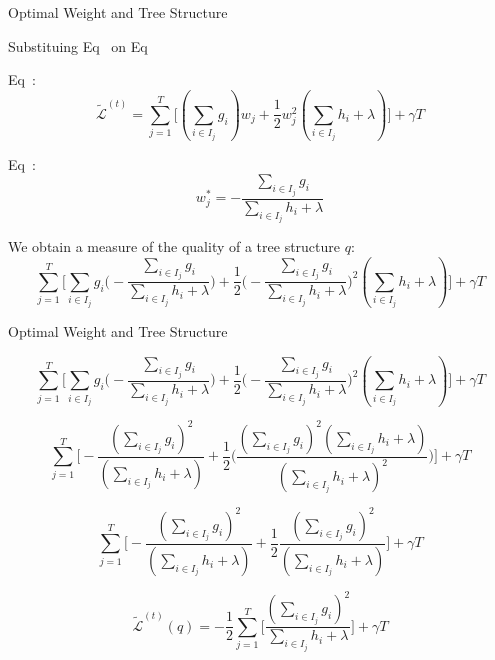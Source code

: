 \documentclass{beamer}
\begin{document}
\begin{frame}{Optimal Weight and Tree Structure}
	
Substituing Eq~ on Eq~

Eq~:
\begin{equation*}
\tilde{\mathcal{L}}^{(t)} = \sum_{j=1}^{T}
\big[ 
(\sum_{i \in I_j}g_i ) w_j + 
\frac{1}{2} w_j^2 (\sum_{i \in I_j} h_i + \lambda)
\big]
+ \gamma T
\end{equation*}

Eq~:
\begin{equation*}
w^*_j= - \frac{\sum_{i \in I_j}g_i}{\sum_{i \in I_j} h_i + \lambda }
\end{equation*}

We obtain a measure of the quality of a tree structure $q$:
\begin{equation*}
\sum_{j=1}^{T}
\big[ 
\sum_{i \in I_j}g_i \Bigg( - \frac{\sum_{i \in I_j}g_i }{\sum_{i \in I_j} h_i + \lambda } \Bigg) + 
\frac{1}{2} \Bigg(- \frac{\sum_{i \in I_j}g_i}{\sum_{i \in I_j} h_i + \lambda } \Bigg)^2 (\sum_{i \in I_j} h_i + \lambda)
\big]
+ \gamma T
\end{equation*}
	
\end{frame}

\begin{frame}{Optimal Weight and Tree Structure}

\begin{equation*}
\sum_{j=1}^{T}
\big[ 
\sum_{i \in I_j}g_i \Bigg( - \frac{\sum_{i \in I_j}g_i }{\sum_{i \in I_j} h_i + \lambda } \Bigg) + 
\frac{1}{2} \Bigg(- \frac{\sum_{i \in I_j}g_i}{\sum_{i \in I_j} h_i + \lambda } \Bigg)^2 (\sum_{i \in I_j} h_i + \lambda)
\big]
+ \gamma T
\end{equation*}

\begin{equation*}
\sum_{j=1}^{T}
\big[ 
- \frac{(\sum_{i \in I_j}g_i )^2}{(\sum_{i \in I_j} h_i + \lambda) } + 
\frac{1}{2} \Bigg( \frac{(\sum_{i \in I_j}g_i )^2 (\sum_{i \in I_j} h_i + \lambda) }{(\sum_{i \in I_j} h_i + \lambda)^2 } \Bigg)
\big]
+ \gamma T
\end{equation*}

\begin{equation*}
\sum_{j=1}^{T}
\big[ 
- \frac{(\sum_{i \in I_j}g_i )^2}{(\sum_{i \in I_j} h_i + \lambda) } 
+ \frac{1}{2} \frac{(\sum_{i \in I_j}g_i )^2}{(\sum_{i \in I_j} h_i + \lambda) }
\big]
+ \gamma T
\end{equation*}

\begin{equation}\label{eq:quality_tree}
\tilde{\mathcal{L}}^{(t)}(q) = - \frac{1}{2} \sum_{j=1}^{T}
\big[  \frac{(\sum_{i \in I_j}g_i )^2}{ \sum_{i \in I_j} h_i + \lambda }
\big]
+ \gamma T
\end{equation}

\end{frame}
\end{document}
